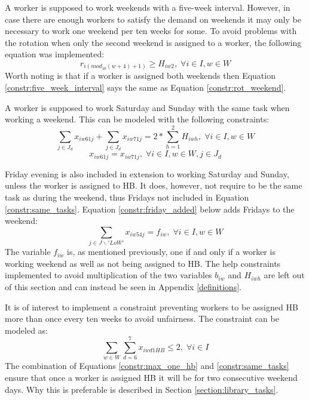 A worker is supposed to work weekends with a five-week interval. However, in case there are enough workers to satisfy the demand on weekends it may only be necessary to work one weekend per ten weeks for some. To avoid problems with the rotation when only the second weekend is assigned to a worker, the following equation was implemented:
\begin{equation} \label{constr:five_week_interval}
r_{i(mod_{10}(w+4)+1)} \geq H_{iw2}, \; \forall i\in I, w \in W
\end{equation}
Worth noting is that if a worker is assigned both weekends then Equation \ref{constr:five_week_interval} says the same as Equation \ref{constr:rot_weekend}.

A worker is supposed to work Saturday and Sunday with the same task when working a weekend. This can be modeled with the following constraints:
\begin{equation} \label{constr:consecutive_days}
\sum_{j \in J_d} x_{iw61j} + \sum_{j \in J_d} x_{iw71j} = 2*\sum_{h = 1}^{2} H_{iwh}, \; \forall i\in I, w \in W
\end{equation}
\begin{equation} \label{constr:same_tasks}
x_{iw61j} = x_{iw71j}, \; \forall i\in I, w \in W, j \in J_d
\end{equation}

Friday evening is also included in extension to working Saturday and Sunday, unless the worker is assigned to HB. It does, however, not require to be the same task as during the weekend, thus Fridays not included in Equation \ref{constr:same_tasks}. Equation \ref{constr:friday_added} below adds Fridays to the weekend:
\begin{equation} \label{constr:friday_added}
\sum_{j \in J \backslash 'LoW'}x_{iw54j} = f_{iw}, \; \forall i \in I, w \in W
\end{equation}
The variable $f_{iw}$ is, as mentioned previously, one if and only if a worker is working weekend as well as not being assigned to HB. The help constraints implemented to avoid multiplication of the two variables $b_{iw}$ and $H_{iwh}$ are left out of this section and can instead be seen in Appendix \ref{definitions}.

It is of interest to implement a constraint preventing workers to be assigned HB more than once every ten weeks to avoid unfairness. The constraint can be modeled as:
\begin{equation} \label{constr:max_one_hb}
\sum_{w \in W}\sum_{d = 6}^{7}x_{iwd1HB} \leq 2, \; \forall i \in I
\end{equation}
The combination of Equations \ref{constr:max_one_hb} and \ref{constr:same_tasks} ensure that once a worker is assigned HB it will be for two consecutive weekend days. Why this is preferable is described in Section \ref{section:library_tasks}.

